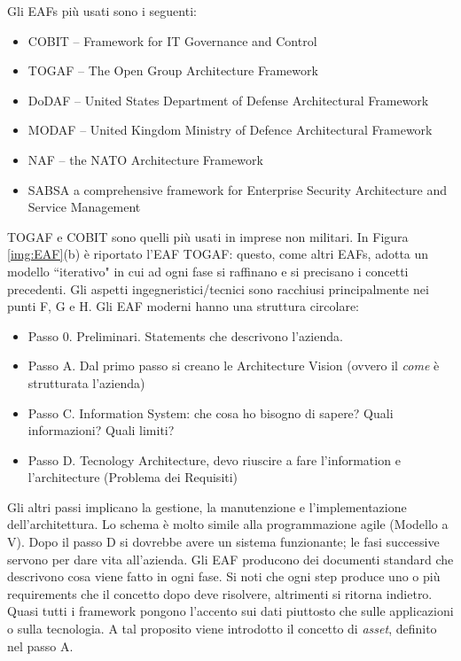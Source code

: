 Gli EAFs più usati sono i seguenti:
\begin{itemize}
	\item COBIT -- Framework for IT Governance and Control
	\item TOGAF -- The Open Group Architecture Framework
	\item DoDAF -- United States Department of Defense Architectural Framework
	\item MODAF -- United Kingdom Ministry of Defence Architectural Framework
	\item NAF -- the NATO Architecture Framework
	\item SABSA a comprehensive framework for Enterprise Security Architecture and Service Management
\end{itemize}
TOGAF e COBIT sono quelli più usati in imprese non militari. In Figura \ref{img:EAF}(b) è riportato l'EAF TOGAF: questo, come altri EAFs, adotta un modello \textquotedblleft iterativo" in cui ad ogni fase si raffinano e si precisano i concetti precedenti. Gli aspetti ingegneristici/tecnici sono racchiusi principalmente nei punti F, G e H. Gli EAF moderni hanno una struttura circolare:
\begin{itemize}
	\item Passo 0. Preliminari. Statements che descrivono l'azienda.
	\item Passo A. Dal primo passo si creano le Architecture Vision (ovvero il \textit{come} è strutturata l'azienda)
	\item Passo C. Information System: che cosa ho bisogno di sapere? Quali informazioni? Quali limiti?
	\item Passo D. Tecnology Architecture, devo riuscire a fare l'information e l'architecture (Problema dei Requisiti)
\end{itemize}
Gli altri passi implicano la gestione, la manutenzione e l'implementazione dell'architettura. Lo schema è molto simile alla programmazione agile (Modello a V). Dopo il passo D si dovrebbe avere un sistema funzionante; le fasi successive servono per dare vita all'azienda. Gli EAF producono dei documenti standard che descrivono cosa viene fatto in ogni fase. Si noti che ogni step produce uno o più requirements che il concetto dopo deve risolvere, altrimenti si ritorna indietro. Quasi tutti i framework pongono l'accento sui dati piuttosto che sulle applicazioni o sulla tecnologia. A tal proposito viene introdotto il concetto di \textit{asset}, definito nel passo A.

